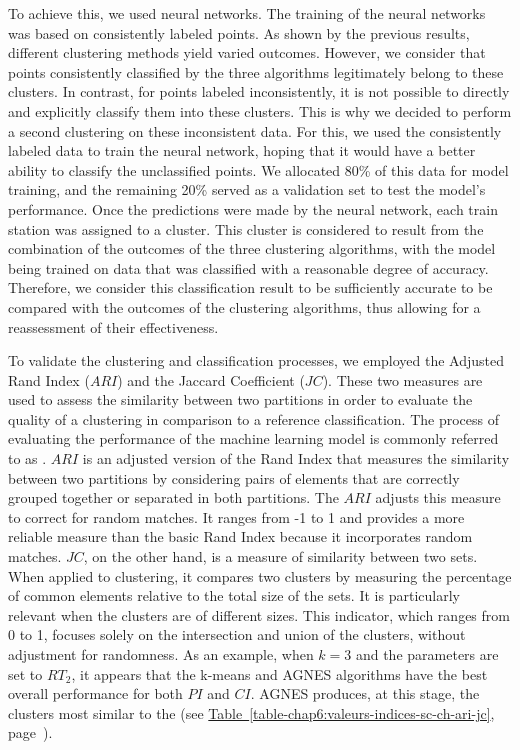 \begin{refsegment}
To achieve this, we used neural networks. The training of the neural networks was based on consistently labeled points. As shown by the previous results, different clustering methods yield varied outcomes. However, we consider that points consistently classified by the three algorithms legitimately belong to these clusters. In contrast, for points labeled inconsistently, it is not possible to directly and explicitly classify them into these clusters. This is why we decided to perform a second clustering on these inconsistent data. For this, we used the consistently labeled data to train the neural network, hoping that it would have a better ability to classify the unclassified points. We allocated 80\% of this data for model training, and the remaining 20\% served as a validation set to test the model's performance. Once the predictions were made by the neural network, each train station was assigned to a cluster. This cluster is considered to result from the combination of the outcomes of the three clustering algorithms, with the model being trained on data that was classified with a reasonable degree of accuracy. Therefore, we consider this classification result to be sufficiently accurate to be compared with the outcomes of the clustering algorithms, thus allowing for a reassessment of their effectiveness.%

To validate the clustering and classification processes, we employed the Adjusted Rand Index (\(ARI\)) and the Jaccard Coefficient (\(JC\)). These two measures are used to assess the similarity between two partitions in order to evaluate the quality of a clustering in comparison to a reference classification. The process of evaluating the performance of the machine learning model is commonly referred to as . \(ARI\) is an adjusted version of the Rand Index that measures the similarity between two partitions by considering pairs of elements that are correctly grouped together or separated in both partitions. The \(ARI\) adjusts this measure to correct for random matches. It ranges from -1 to 1 and provides a more reliable measure than the basic Rand Index because it incorporates random matches. \(JC\), on the other hand, is a measure of similarity between two sets. When applied to clustering, it compares two clusters by measuring the percentage of common elements relative to the total size of the sets. It is particularly relevant when the clusters are of different sizes. This indicator, which ranges from 0 to 1, focuses solely on the intersection and union of the clusters, without adjustment for randomness. As an example, when \(k = 3\) and the parameters are set to \(RT_{2}\), it appears that the k-means and \acrshort{AGNES} algorithms have the best overall performance for both \(PI\) and \(CI\). \acrshort{AGNES} produces, at this stage, the clusters most similar to the  (see \hyperref[table-chap6:valeurs-indices-sc-ch-ari-jc]{Table~\ref{table-chap6:valeurs-indices-sc-ch-ari-jc}}, page~\pageref{table-chap6:valeurs-indices-sc-ch-ari-jc}).%


\end{refsegment}
